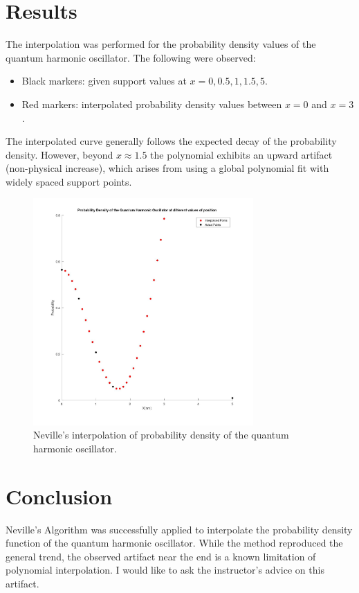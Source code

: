 \section*{Results}
The interpolation was performed for the probability density values of the quantum
harmonic oscillator. The following were observed:
\begin{itemize}
  \item Black markers: given support values at $x = 0, 0.5, 1, 1.5, 5$.
  \item Red markers: interpolated probability density values between $x=0$ and $x=3$.
\end{itemize}

The interpolated curve generally follows the expected decay of the probability density.
However, beyond $x \approx 1.5$ the polynomial exhibits an upward artifact
(non-physical increase), which arises from using a global polynomial fit with
widely spaced support points.

\begin{figure}[h!]
  \centering
  \includegraphics[width=0.75\textwidth]{a4.jpg}
  \caption{Neville’s interpolation of probability density of the quantum harmonic oscillator.}
\end{figure}

\section*{Conclusion}
Neville’s Algorithm was successfully applied to interpolate the probability density
function of the quantum harmonic oscillator. While the method reproduced the general
trend, the observed artifact near the end is a known limitation of polynomial
interpolation. I would like to ask the instructor’s advice on this artifact.

